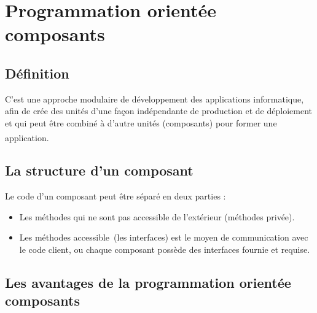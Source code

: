 \documentclass[12pt]{report}
\begin{document}
\section{Programmation orientée composants}
\subsection{Définition}
\vspace{0.1in}
\hspace*{0.16in}
C’est une approche modulaire de développement des applications informatique, afin de crée des unités d’une façon indépendante de production et de déploiement et qui peut être combiné à d’autre unités (composants) pour former une application. \textsuperscript{\cite{stephane2002poo}}

\subsection{La structure d’un composant}
\vspace{0.1in}
Le code d’un composant peut être séparé en deux parties :

\begin{itemize}
    \item Les méthodes qui ne sont pas accessible de l’extérieur (méthodes privée).
    \item Les méthodes accessible (les interfaces) est le moyen de communication avec le code client, ou chaque composant possède des interfaces fournie et requise.
\end{itemize}

\subsection{Les avantages de la programmation orientée composants}
\vspace{0.1in}
\end{document}

